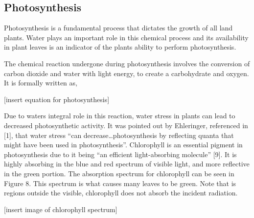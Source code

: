 \subsection{Photosynthesis}

Photosynthesis is a fundamental process that dictates the growth of all land plants.  Water plays an important role in this chemical process and its availability in plant leaves is an indicator of the plants ability to perform photosynthesis.

The chemical reaction undergone during photosynthesis involves the conversion of carbon dioxide and water with light energy, to create a carbohydrate and oxygen.  It is formally written as,

[insert equation for photosynthesis]

Due to waters integral role in this reaction, water stress in plants can lead to decreased photosynthetic activity.  It was pointed out by Ehleringer, referenced in [1], that water stress “can decrease…photosynthesis by reflecting quanta that might have been used in photosynthesis”.   Chlorophyll is an essential pigment in photosynthesis due to it being “an efficient light-absorbing molecule” [9].  It is highly absorbing in the blue and red spectrum of visible light, and more reflective in the green portion.  The absorption spectrum for chlorophyll can be seen in Figure 8. This spectrum is what causes many leaves to be green.  Note that is regions outside the visible, chlorophyll does not absorb the incident radiation.

[insert image of chlorophyll spectrum]

